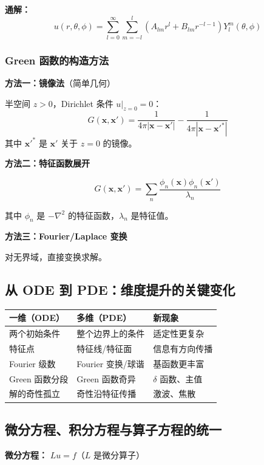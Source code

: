 \textbf{通解：}
\[
u(r,\theta,\phi) = \sum_{l=0}^{\infty}\sum_{m=-l}^{l} \left(A_{lm}r^l + B_{lm}r^{-l-1}\right)Y_l^m(\theta,\phi)
\]

\subsubsection{Green 函数的构造方法}

\textbf{方法一：镜像法}（简单几何）

半空间 $z > 0$，Dirichlet 条件 $u|_{z=0} = 0$：
\[
G(\mathbf{x}, \mathbf{x}') = \frac{1}{4\pi|\mathbf{x}-\mathbf{x}'|} - \frac{1}{4\pi|\mathbf{x}-\mathbf{x}'^*|}
\]
其中 $\mathbf{x}'^*$ 是 $\mathbf{x}'$ 关于 $z=0$ 的镜像。

\textbf{方法二：特征函数展开}

\[
G(\mathbf{x}, \mathbf{x}') = \sum_n \frac{\phi_n(\mathbf{x})\phi_n(\mathbf{x}')}{\lambda_n}
\]

其中 $\phi_n$ 是 $-\nabla^2$ 的特征函数，$\lambda_n$ 是特征值。

\textbf{方法三：Fourier/Laplace 变换}

对无界域，直接变换求解。

\subsection{从 ODE 到 PDE：维度提升的关键变化}

\begin{center}
\begin{tabular}{p{3cm}p{4cm}p{4cm}}
\toprule
\textbf{一维（ODE）} & \textbf{多维（PDE）} & \textbf{新现象} \\
\midrule
两个初始条件 & 整个边界上的条件 & 适定性更复杂 \\
特征点 & 特征线/特征面 & 信息有方向传播 \\
Fourier 级数 & Fourier 变换/球谐 & 基函数更丰富 \\
Green 函数分段 & Green 函数奇异 & $\delta$ 函数、主值 \\
解的奇性孤立 & 奇性沿特征传播 & 激波、焦散 \\
\bottomrule
\end{tabular}
\end{center}

\subsection{微分方程、积分方程与算子方程的统一}

\textbf{微分方程：} $Lu = f$（$L$ 是微分算子）

